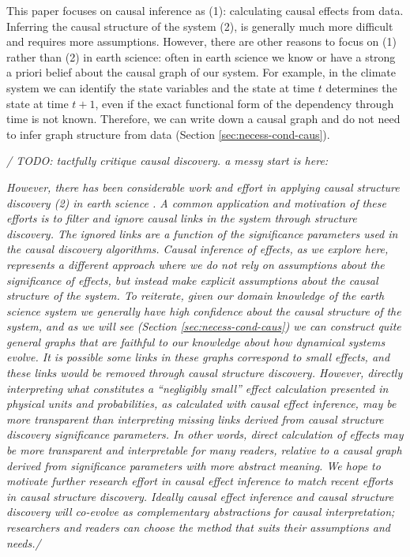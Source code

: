 \documentclass[12pt]{article}
\begin{document}
This paper focuses on causal inference as (1): calculating causal
effects from data. Inferring the causal structure of the system (2),
is generally much more difficult and requires more
assumptions. However, there are other reasons to focus on (1) rather
than (2) in earth science: often in earth science we know or have a
strong a priori belief about the causal graph of our system. For
example, in the climate system we can identify the state variables and
the state at time \(t\) determines the state at time \(t+1\), even if
the exact functional form of the dependency through time is not
known. Therefore, we can write down a causal graph and do not need to
infer graph structure from data (Section \ref{sec:necess-cond-caus}).

\textit{/ TODO: tactfully critique causal discovery. a messy start is
  here:}

\textit{
  However, there has been considerable work and effort in applying
  causal structure discovery (2) in earth science
  \citep[e.g.,][]{ebert-uphoff2012,
    samarasinghe-casuality,runge-causal-timeseries,runge2019inferring}. A
  common application and motivation of these efforts is to filter and
  ignore causal links in the system through structure discovery. The
  ignored links are a function of the significance parameters used in
  the causal discovery algorithms. Causal inference of effects, as we
  explore here, represents a different approach where we do not rely on
  assumptions about the significance of effects, but instead make
  explicit assumptions about the causal structure of the system. To
  reiterate, given our domain knowledge of the earth science system we
  generally have high confidence about the causal structure of the
  system, and as we will see (Section \ref{sec:necess-cond-caus}) we can
  construct quite general graphs that are faithful to our knowledge
  about how dynamical systems evolve. It is possible some links in these
  graphs correspond to small effects, and these links would be removed
  through causal structure discovery. However, directly interpreting
  what constitutes a ``negligibly small'' effect calculation presented in
  physical units and probabilities, as calculated with causal effect
  inference, may be more transparent than interpreting missing links
  derived from causal structure discovery significance parameters. In
  other words, direct calculation of effects may be more transparent and
  interpretable for many readers, relative to a causal graph derived
  from significance parameters with more abstract meaning. We hope to
  motivate further research effort in causal effect inference to match
  recent efforts in causal structure discovery. Ideally causal effect
  inference and causal structure discovery will co-evolve as
  complementary abstractions for causal interpretation; researchers and
  readers can choose the method that suits their assumptions and
  needs./}
\end{document}
